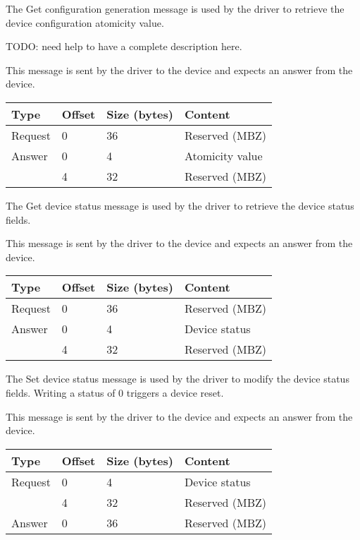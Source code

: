 
The Get configuration generation message is used by the driver to retrieve the
device configuration atomicity value.

TODO: need help to have a complete description here.

This message is sent by the driver to the device and expects an answer from the
device.

\begin{tabular}{|l|l|l|l|}
\hline
Type & Offset & Size (bytes) & Content \\
\hline \hline
Request & 0 & 36 & Reserved (MBZ) \\
\hline
Answer & 0 & 4 & Atomicity value \\
& 4 & 32 & Reserved (MBZ) \\
\hline
\end{tabular}


The Get device status message is used by the driver to retrieve the device
status fields.

This message is sent by the driver to the device and expects an answer from the
device.

\begin{tabular}{|l|l|l|l|}
\hline
Type & Offset & Size (bytes) & Content \\
\hline \hline
Request & 0 & 36 & Reserved (MBZ) \\
\hline
Answer & 0 & 4 & Device status \\
& 4 & 32 & Reserved (MBZ) \\
\hline
\end{tabular}


The Set device status message is used by the driver to modify the device status
fields. Writing a status of 0 triggers a device reset.

This message is sent by the driver to the device and expects an answer from the
device.

\begin{tabular}{|l|l|l|l|}
\hline
Type & Offset & Size (bytes) & Content \\
\hline \hline
Request & 0 & 4 & Device status \\
& 4 & 32 & Reserved (MBZ) \\
\hline
Answer & 0 & 36 & Reserved (MBZ) \\
\hline
\end{tabular}

